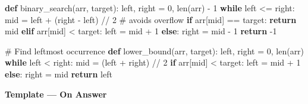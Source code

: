 \documentclass[11pt]{article}
\newenvironment{Shaded}{\begin{snugshade}}{\end{snugshade}}
\newcommand{\BuiltInTok}[1]{\textcolor[rgb]{0.50,0.55,0.55}{#1}}
\newcommand{\CommentTok}[1]{\textcolor[rgb]{0.48,0.49,0.49}{#1}}
\newcommand{\ControlFlowTok}[1]{\textcolor[rgb]{0.99,0.74,0.29}{\textbf{#1}}}
\newcommand{\DecValTok}[1]{\textcolor[rgb]{0.96,0.45,0.00}{#1}}
\newcommand{\KeywordTok}[1]{\textcolor[rgb]{0.81,0.81,0.76}{\textbf{#1}}}
\newcommand{\NormalTok}[1]{\textcolor[rgb]{0.81,0.81,0.76}{#1}}
\newcommand{\OperatorTok}[1]{\textcolor[rgb]{0.81,0.81,0.76}{#1}}
\begin{document}
\begin{Shaded}
\begin{Highlighting}[]
\KeywordTok{def}\NormalTok{ binary\_search(arr, target):}
\NormalTok{    left, right }\OperatorTok{=} \DecValTok{0}\NormalTok{, }\BuiltInTok{len}\NormalTok{(arr) }\OperatorTok{{-}} \DecValTok{1}
    \ControlFlowTok{while}\NormalTok{ left }\OperatorTok{\textless{}=}\NormalTok{ right:}
\NormalTok{        mid }\OperatorTok{=}\NormalTok{ left }\OperatorTok{+}\NormalTok{ (right }\OperatorTok{{-}}\NormalTok{ left) }\OperatorTok{//} \DecValTok{2}    \CommentTok{\# avoids overflow}
        \ControlFlowTok{if}\NormalTok{ arr[mid] }\OperatorTok{==}\NormalTok{ target:}
            \ControlFlowTok{return}\NormalTok{ mid}
        \ControlFlowTok{elif}\NormalTok{ arr[mid] }\OperatorTok{\textless{}}\NormalTok{ target:}
\NormalTok{            left }\OperatorTok{=}\NormalTok{ mid }\OperatorTok{+} \DecValTok{1}
        \ControlFlowTok{else}\NormalTok{:}
\NormalTok{            right }\OperatorTok{=}\NormalTok{ mid }\OperatorTok{{-}} \DecValTok{1}
    \ControlFlowTok{return} \OperatorTok{{-}}\DecValTok{1}

\CommentTok{\# Find leftmost occurrence}
\KeywordTok{def}\NormalTok{ lower\_bound(arr, target):}
\NormalTok{    left, right }\OperatorTok{=} \DecValTok{0}\NormalTok{, }\BuiltInTok{len}\NormalTok{(arr)}
    \ControlFlowTok{while}\NormalTok{ left }\OperatorTok{\textless{}}\NormalTok{ right:}
\NormalTok{        mid }\OperatorTok{=}\NormalTok{ (left }\OperatorTok{+}\NormalTok{ right) }\OperatorTok{//} \DecValTok{2}
        \ControlFlowTok{if}\NormalTok{ arr[mid] }\OperatorTok{\textless{}}\NormalTok{ target:}
\NormalTok{            left }\OperatorTok{=}\NormalTok{ mid }\OperatorTok{+} \DecValTok{1}
        \ControlFlowTok{else}\NormalTok{:}
\NormalTok{            right }\OperatorTok{=}\NormalTok{ mid}
    \ControlFlowTok{return}\NormalTok{ left}
\end{Highlighting}
\end{Shaded}

\textbf{Template --- On Answer}

\end{document}
